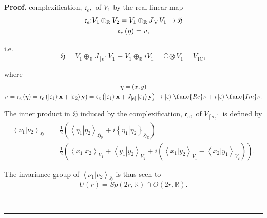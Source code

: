 \documentclass[aps,preprint]{revtex4}
\newenvironment{proof}[1][Proof]{\noindent\textbf{#1.} }{\ \rule{0.5em}{0.5em}}
\begin{document}
\begin{proof}
complexification, $\mathfrak{c}_{e},$ of $V_{1}$ by the real linear map 
\begin{gather}
\mathfrak{c}_{e}\mathfrak{:}V_{1}\oplus _{\mathbb{R}}V_{2}=V_{1}\oplus _{%
\mathbb{R}}J_{\left[ e\right] }V_{1}\rightarrow \mathfrak{H} \\
\mathfrak{c}_{e}\left( \eta \right) =v,
\end{gather}

i.e.%
\begin{equation}
\mathfrak{H}=V_{1}\oplus_{\mathbb{R}}J_{\left[ e\right] }V_{1}\equiv
V_{1}\oplus_{\mathbb{R}}iV_{1}=\mathbb{C\otimes}V_{1}=V_{1\mathbb{C}},
\end{equation}

where 
\begin{gather}
\eta=\left( x,y\right) \\
\nu=\mathfrak{c}_{e}\left( \eta\right) =\mathfrak{c}_{e}\left( \left\vert 
\mathbf{\varepsilon}_{1}\right\rangle \mathbf{x}+\left\vert \mathbf{%
\varepsilon}_{2}\right\rangle \mathbf{y}\right) =\mathfrak{c}_{e}\left(
\left\vert \mathbf{\varepsilon}_{1}\right\rangle \mathbf{x}+J_{\left[ e%
\right] }\left\vert \mathbf{\varepsilon}_{1}\right\rangle \mathbf{y}\right)
\rightarrow\left\vert \mathbf{\varepsilon}\right\rangle \func{Re}\mathbf{\nu}%
+i\left\vert \mathbf{\varepsilon}\right\rangle \func{Im}\mathbf{\nu}.
\end{gather}

The inner product in $\mathfrak{H}$ induced by the complexification, $%
\mathfrak{c}_{e},$ of $V_{\left[ \sigma_{e}\right] }$ is defined by%
\begin{align}
\left\langle \left. \nu_{1}\right\vert \nu_{2}\right\rangle _{\mathfrak{H}}
& =\frac{1}{2}\left( \left\langle \left. \eta_{1}\right\vert \eta
_{2}\right\rangle _{\mathfrak{H}_{\mathbb{R}}}+i\left\{ \left. \eta
_{1}\right\vert \eta_{2}\right\} _{\mathfrak{H}_{\mathbb{R}}}\right) \\
& =\frac{1}{2}\left( \left\langle \left. x_{1}\right\vert x_{2}\right\rangle
_{V_{1}}+\left\langle \left. y_{1}\right\vert y_{2}\right\rangle
_{V_{2}}+i\left( \left\langle \left. x_{1}\right\vert y_{2}\right\rangle
_{V_{1}}-\left\langle \left. x_{2}\right\vert y_{1}\right\rangle
_{V_{2}}\right) \right) .
\end{align}

The invariance group of $\left\langle \left. \nu_{1}\right\vert \nu
_{2}\right\rangle _{\mathfrak{H}}$ is thus seen to 
\begin{equation}
U\left( r\right) =Sp\left( 2r,\mathbb{R}\right) \cap O\left( 2r,\mathbb{R}%
\right) .
\end{equation}


\end{proof}
\end{document}
